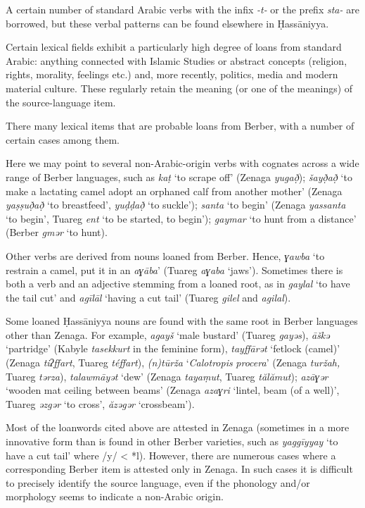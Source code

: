 \documentclass[output=paper]{langsci/langscibook}
\begin{document}
A certain number of standard Arabic verbs with the infix \textit{{}-}\textit{t-} or the prefix \textit{sta-} are borrowed, but these verbal patterns can be found elsewhere in Ḥassāniyya. 

Certain lexical fields exhibit a particularly high degree of loans from standard Arabic: anything connected with Islamic Studies or abstract concepts (religion, rights, morality, feelings etc.) and, more recently, politics, media and modern material culture. These regularly retain the meaning (or one of the meanings) of the source-language item. 


There many lexical items that are probable loans from Berber, with a number of certain cases among them. 

Here we may point to several non-Arabic-origin verbs with cognates across a wide range of Berber languages, such as \textit{k{\R}aṭ} ‘to scrape off’ (Zenaga \textit{yug{\R}að̣}); \textit{šayð̣að̣} ‘to make a lactating camel adopt an orphaned calf from another mother’ (Zenaga \textit{yaṣṣuð̣að̣} ‘to breastfeed’, \textit{yuḍḍað̣} ‘to suckle’); \textit{santa} ‘to begin’ (Zenaga \textit{yassanta} ‘to begin’, Tuareg \textit{ent} ‘to be started, to begin’); \textit{gaymar} ‘to hunt from a distance’ (Berber \textit{gmər} ‘to hunt). 

Other verbs are derived from nouns loaned from Berber. Hence, \textit{ɣawba} ‘to restrain a camel, put it in an \textit{aɣāba}’ (Tuareg \textit{aɣaba} ‘jaws’). Sometimes there is both a verb and an adjective stemming from a loaned root, as in \textit{gaylal} ‘to have the tail cut’ and \textit{agīlāl} ‘having a cut tail’ (Tuareg \textit{gilel} and \textit{agilal}). 

Some loaned Ḥassāniyya nouns are found with the same root in Berber languages other than Zenaga. For example, \textit{agayš} ‘male bustard’ (Tuareg \textit{gayəs}), \textit{āškə{\R}} ‘partridge’ (Kabyle \textit{tasekkurt} in the feminine form), \textit{tayffārət} ‘fetlock (camel)’ (Zenaga \textit{tiʔffart}, Tuareg \textit{téffart}), \textit{(n)tūrža} ‘\textit{Calotropis} \textit{procera}’ (Zenaga \textit{turžah,} Tuareg \textit{tərza}), \textit{talawmāyət} ‘dew’ (Zenaga \textit{tayaṃut}, Tuareg \textit{tălămut}); \textit{azāɣər} ‘wooden mat ceiling between beams’ (Zenaga \textit{azaɣri} ‘lintel, beam (of a well)’, Tuareg \textit{ǝzgər} ‘to cross’, \textit{ăzəgər} ‘crossbeam’).

Most of the loanwords cited above are attested in Zenaga (sometimes in a more innovative form than is found in other Berber varieties, such as \textit{yaggīyyay} ‘to have a cut tail’ where /y/ < *l). However, there are numerous cases where a corresponding Berber item is attested only in Zenaga. In such cases it is difficult to precisely identify the source language, even if the phonology and/or morphology seems to indicate a non-Arabic origin. 
\end{document}
